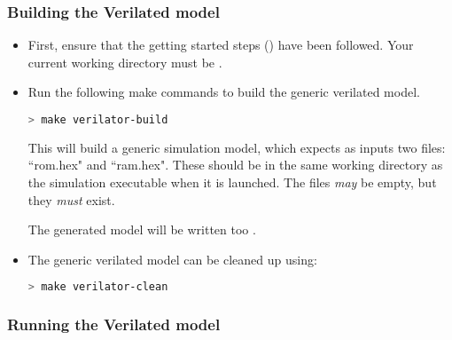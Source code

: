 \subsubsection{Building the Verilated model}

\begin{itemize}
\item First, ensure that the getting started steps 
    () have been followed.
    Your current working directory must be \SOCHOME.

\item Run the following make commands to build the generic verilated model.

\begin{lstlisting}[language=bash,style=block]
> make verilator-build
\end{lstlisting}

    This will build a generic simulation model, which expects as inputs
    two files: ``rom.hex" and ``ram.hex".
    These should be in the same working directory as the simulation
    executable when it is launched.
    The files {\em may} be empty, but they {\em must} exist.

    The generated model will be written too
    .

\item The generic verilated model can be cleaned up using:
    
\begin{lstlisting}[language=bash,style=block]
> make verilator-clean
\end{lstlisting}

\end{itemize}

\subsubsection{Running the Verilated model}

